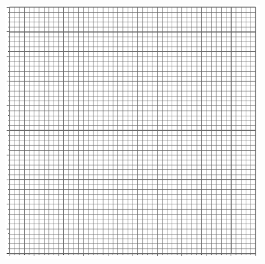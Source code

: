 \documentclass[UTF8]{article}
\begin{document}
\begin{figure}[H]\centering
\includegraphics[width=0.65\columnwidth]{assets/50x50.pdf}
\end{figure}
\end{document}
